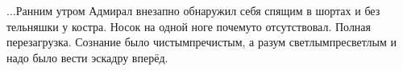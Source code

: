 



\begin{center}
\end{center}

$\ldots$Ранним утром Адмирал внезапно обнаружил себя спящим в шортах и без тельняшки у костра. Носок на одной ноге почему\sdash то отсутствовал. Полная перезагрузка. Сознание было чистым\sdash пречистым, а разум светлым\sdash пресветлым и надо было вести эскадру вперёд.

\begin{center}
\end{center}
